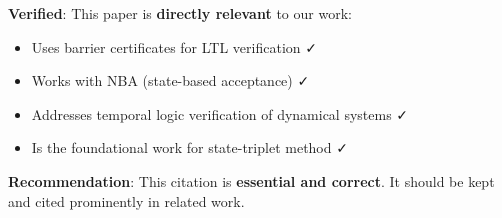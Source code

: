 \documentclass{article}
\begin{document}
\textbf{Verified}: This paper is \textbf{directly relevant} to our work:
\begin{itemize}
    \item Uses barrier certificates for LTL verification ✓
    \item Works with NBA (state-based acceptance) ✓
    \item Addresses temporal logic verification of dynamical systems ✓
    \item Is the foundational work for state-triplet method ✓
\end{itemize}

\textbf{Recommendation}: This citation is \textbf{essential and correct}. It should be kept and cited prominently in related work.
\end{document}
